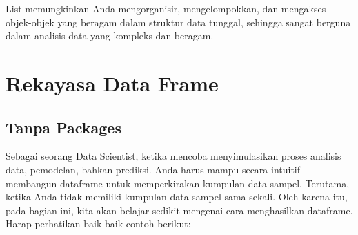 \documentclass[
]{book}
\begin{document}
List memungkinkan Anda mengorganisir, mengelompokkan, dan mengakses objek-objek yang beragam dalam struktur data tunggal, sehingga sangat berguna dalam analisis data yang kompleks dan beragam.

\hypertarget{rekayasa-data-frame}{%
\section{Rekayasa Data Frame}\label{rekayasa-data-frame}}

\hypertarget{tanpa-packages}{%
\subsection{Tanpa Packages}\label{tanpa-packages}}

Sebagai seorang Data Scientist, ketika mencoba menyimulasikan proses analisis data, pemodelan, bahkan prediksi. Anda harus mampu secara intuitif membangun dataframe untuk memperkirakan kumpulan data sampel. Terutama, ketika Anda tidak memiliki kumpulan data sampel sama sekali. Oleh karena itu, pada bagian ini, kita akan belajar sedikit mengenai cara menghasilkan dataframe. Harap perhatikan baik-baik contoh berikut:
\end{document}
